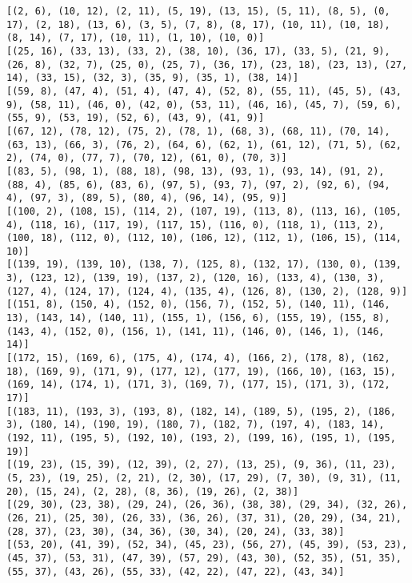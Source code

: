 \documentclass[11pt]{article}
\begin{document}
    \begin{Verbatim}[commandchars=\\\{\}]
[(2, 6), (10, 12), (2, 11), (5, 19), (13, 15), (5, 11), (8, 5), (0, 17), (2, 18), (13, 6), (3, 5), (7, 8), (8, 17), (10, 11), (10, 18), (8, 14), (7, 17), (10, 11), (1, 10), (10, 0)]
[(25, 16), (33, 13), (33, 2), (38, 10), (36, 17), (33, 5), (21, 9), (26, 8), (32, 7), (25, 0), (25, 7), (36, 17), (23, 18), (23, 13), (27, 14), (33, 15), (32, 3), (35, 9), (35, 1), (38, 14)]
[(59, 8), (47, 4), (51, 4), (47, 4), (52, 8), (55, 11), (45, 5), (43, 9), (58, 11), (46, 0), (42, 0), (53, 11), (46, 16), (45, 7), (59, 6), (55, 9), (53, 19), (52, 6), (43, 9), (41, 9)]
[(67, 12), (78, 12), (75, 2), (78, 1), (68, 3), (68, 11), (70, 14), (63, 13), (66, 3), (76, 2), (64, 6), (62, 1), (61, 12), (71, 5), (62, 2), (74, 0), (77, 7), (70, 12), (61, 0), (70, 3)]
[(83, 5), (98, 1), (88, 18), (98, 13), (93, 1), (93, 14), (91, 2), (88, 4), (85, 6), (83, 6), (97, 5), (93, 7), (97, 2), (92, 6), (94, 4), (97, 3), (89, 5), (80, 4), (96, 14), (95, 9)]
[(100, 2), (108, 15), (114, 2), (107, 19), (113, 8), (113, 16), (105, 4), (118, 16), (117, 19), (117, 15), (116, 0), (118, 1), (113, 2), (100, 18), (112, 0), (112, 10), (106, 12), (112, 1), (106, 15), (114, 10)]
[(139, 19), (139, 10), (138, 7), (125, 8), (132, 17), (130, 0), (139, 3), (123, 12), (139, 19), (137, 2), (120, 16), (133, 4), (130, 3), (127, 4), (124, 17), (124, 4), (135, 4), (126, 8), (130, 2), (128, 9)]
[(151, 8), (150, 4), (152, 0), (156, 7), (152, 5), (140, 11), (146, 13), (143, 14), (140, 11), (155, 1), (156, 6), (155, 19), (155, 8), (143, 4), (152, 0), (156, 1), (141, 11), (146, 0), (146, 1), (146, 14)]
[(172, 15), (169, 6), (175, 4), (174, 4), (166, 2), (178, 8), (162, 18), (169, 9), (171, 9), (177, 12), (177, 19), (166, 10), (163, 15), (169, 14), (174, 1), (171, 3), (169, 7), (177, 15), (171, 3), (172, 17)]
[(183, 11), (193, 3), (193, 8), (182, 14), (189, 5), (195, 2), (186, 3), (180, 14), (190, 19), (180, 7), (182, 7), (197, 4), (183, 14), (192, 11), (195, 5), (192, 10), (193, 2), (199, 16), (195, 1), (195, 19)]
[(19, 23), (15, 39), (12, 39), (2, 27), (13, 25), (9, 36), (11, 23), (5, 23), (19, 25), (2, 21), (2, 30), (17, 29), (7, 30), (9, 31), (11, 20), (15, 24), (2, 28), (8, 36), (19, 26), (2, 38)]
[(29, 30), (23, 38), (29, 24), (26, 36), (38, 38), (29, 34), (32, 26), (26, 21), (25, 30), (26, 33), (36, 26), (37, 31), (20, 29), (34, 21), (28, 37), (23, 30), (34, 36), (30, 34), (20, 24), (33, 38)]
[(53, 20), (41, 39), (52, 34), (45, 23), (56, 27), (45, 39), (53, 23), (45, 37), (53, 31), (47, 39), (57, 29), (43, 30), (52, 35), (51, 35), (55, 37), (43, 26), (55, 33), (42, 22), (47, 22), (43, 34)]

\end{Verbatim}
\end{document}
